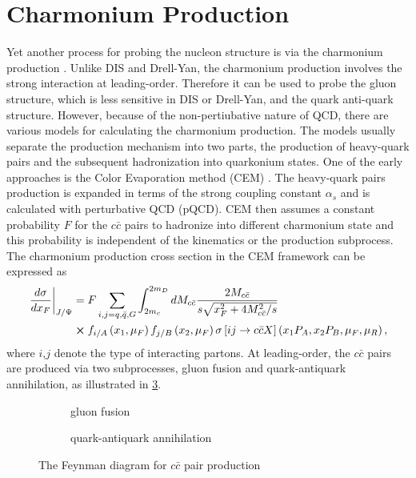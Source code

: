 \documentclass[../main.tex]{subfiles}
\begin{document}
\section{Charmonium Production}
\label{sec:jpsi}
Yet another process for probing the nucleon structure is via the charmonium production \cite{peng1995,chang2020}.
Unlike DIS and Drell-Yan, the charmonium production involves the strong interaction
at leading-order. Therefore it can be used to probe the gluon structure, which is
less sensitive in DIS or Drell-Yan, and the quark anti-quark structure. However,
because of the non-pertiubative nature of QCD, there are various models for
calculating the charmonium production. The models usually separate the production
mechanism into two parts, the production of heavy-quark pairs and the subsequent
hadronization into quarkonium states. One of the early approaches is the Color
Evaporation method (CEM) \cite{einhorn1975,bodwin1995,bodwin1997}. The heavy-quark
pairs production is expanded in terms of the strong coupling constant $\alpha_s$
and is calculated with perturbative QCD (pQCD). CEM then assumes a constant
probability $F$ for the $c\bar{c}$ pairs to hadronize into different charmonium
state and this probability is independent of the kinematics or the production
subprocess. The charmonium production cross section in the CEM framework can be
expressed as
\begin{equation}
	\begin{split}
		\left.\frac{d\sigma}{dx_F}\right|_{J/\Psi} &= F \sum_{i,j = q,\bar{q},G}\int^{2m_D}_{2m_c} dM_{c\bar{c}}  \frac{2M_{c\bar{c}}}{s\sqrt{x_F^2+4M_{c\bar{c}}^2/s}}\\
		&\cross f_{i/A}\left(x_1,\mu_F\right)f_{j/B}\left(x_2,\mu_F\right)\sigma\left[ij\rightarrow c\bar{c}X\right]\left(x_1P_A,x_2P_B,\mu_F,\mu_R \right),
	\end{split}
\end{equation}
where $i$,$j$ denote the type of interacting partons. At leading-order, the
$c\bar{c}$ pairs are produced via two subprocesses, gluon fusion and
quark-antiquark annihilation, as illustrated in \cref{fig:charmonium}.
\begin{figure}[htpb!]
	\centering
	\begin{subfigure}{0.4\linewidth}
		\begin{subfigure}{\linewidth}
			
		\end{subfigure}
		\begin{subfigure}{\linewidth}
			
		\end{subfigure}
		\caption{gluon fusion\label{subfig:gluon}}
	\end{subfigure}
	\quad
	\begin{subfigure}{0.4\linewidth}
		
		\caption{quark-antiquark annihilation\label{subfig:qqbar}}
	\end{subfigure}
	\caption{The Feynman diagram for $c\bar{c}$ pair production}
	\label{fig:charmonium}
\end{figure}
\end{document}
